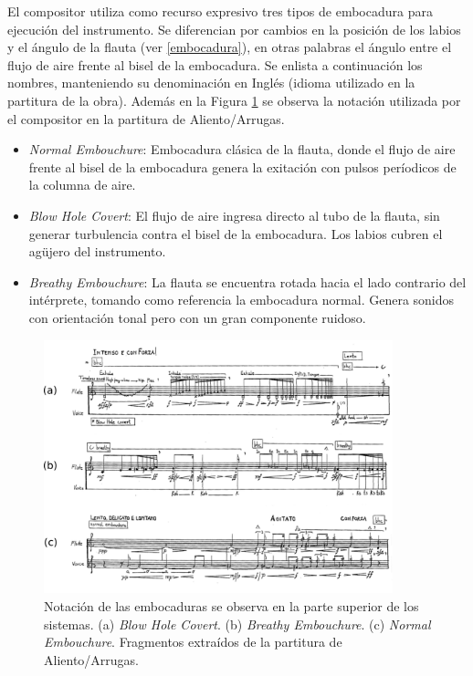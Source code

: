 \documentclass{article}
\begin{document}
El compositor utiliza como recurso expresivo tres tipos de embocadura para ejecución del instrumento. Se diferencian por cambios en la posición de los labios y el ángulo de la flauta (ver \ref{embocadura}), en otras palabras el ángulo entre el flujo de aire frente al bisel de la embocadura. Se enlista a continuación los nombres, manteniendo su denominación en Inglés (idioma utilizado en la partitura de la obra). Además en la Figura \ref{fig:embocaduras} se observa la notación utilizada por el compositor en la partitura de Aliento/Arrugas.

\begin{itemize}
  \item \textit{Normal Embouchure}: Embocadura clásica de la flauta, donde el flujo de aire frente al bisel de la embocadura genera la exitación con pulsos períodicos de la columna de aire. 
  \item \textit{Blow Hole Covert}: El flujo de aire ingresa directo al tubo de la flauta, sin generar turbulencia contra el bisel de la embocadura. Los labios cubren el agüjero del instrumento.
  \item \textit{Breathy Embouchure}: La flauta se encuentra rotada hacia el lado contrario del intérprete, tomando como referencia la embocadura normal. Genera sonidos con orientación tonal pero con un gran componente ruidoso.
\end{itemize}
\medskip

\begin{figure}[H]
\begin{center}
\includegraphics[width=0.9\textwidth]{embocaduras} 
\caption{Notación de las embocaduras se observa en la parte superior de los sistemas. (a) \textit{Blow Hole Covert}. (b) \textit{Breathy Embouchure}. (c) \textit{Normal Embouchure}. Fragmentos extraídos de la partitura de Aliento/Arrugas.}
\label{fig:embocaduras}
\end{center}
\end{figure}
\end{document}
